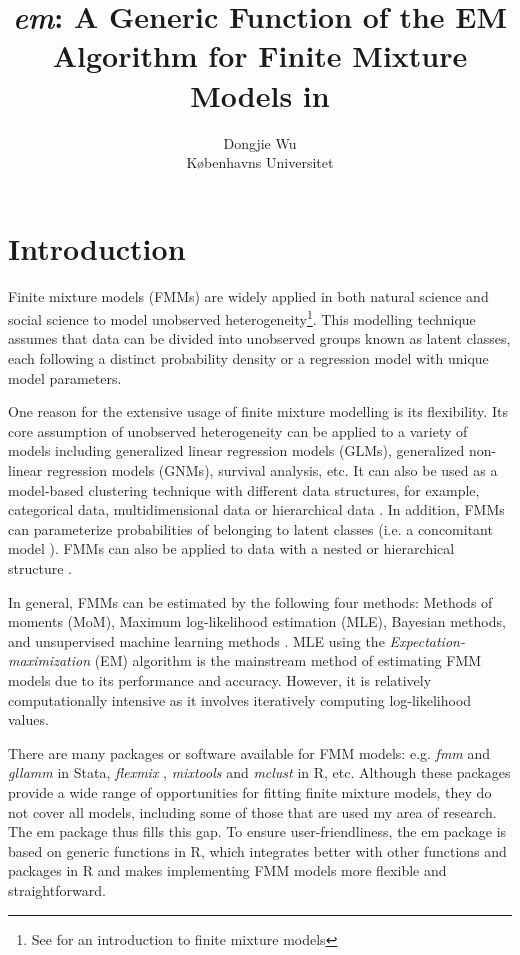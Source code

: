 \documentclass[nojss]{jss}
\title{\emph{em}: A Generic Function of the EM Algorithm for Finite Mixture Models in \proglang{R}}
\author{Dongjie Wu\\Københavns Universitet}
\begin{document}
   \section{Introduction}
Finite mixture models (FMMs) are widely applied in both natural science and social science to model unobserved heterogeneity\footnote{See \citet{mclachlan2019finite} for an introduction to finite mixture models}. This modelling technique assumes that data can be divided into unobserved groups known as latent classes, each following a distinct probability density or a regression model with unique model parameters. 

One reason for the extensive usage of finite mixture modelling is its flexibility. Its core assumption of unobserved heterogeneity can be applied to a variety of models including generalized linear regression models (GLMs), generalized non-linear regression models (GNMs), survival analysis, etc. It can also be used as a model-based clustering technique with different data structures, for example, categorical data, multidimensional data or hierarchical data \citep{vermunt2008latent}. In addition, FMMs can parameterize probabilities of belonging to latent classes (i.e. a concomitant model \citep{wedel2002concomitant}). FMMs can also be applied to data with a nested or hierarchical structure \citep{vermunt2005hierarchical}.

In general, FMMs can be estimated by the following four methods: Methods of moments (MoM), Maximum log-likelihood estimation (MLE), Bayesian methods, and unsupervised machine learning methods \citep{Figue2002}. MLE using the \emph{Expectation-maximization} (EM) algorithm is the mainstream method of estimating FMM models due to its performance and accuracy. However, it is relatively computationally intensive as it involves iteratively computing log-likelihood values. 

There are many packages or software available for FMM models: e.g.  \emph{fmm} \citep{deb2007} and \emph{gllamm} \citep{rabe2004gllamm} in Stata, \emph{flexmix} \citep{leisch2004flexmix}, \emph{mixtools} \citep{benaglia2010mixtools} and \emph{mclust} \citep{scrucca2016mclust} in R, etc.
Although these packages provide a wide range of opportunities for fitting finite mixture models, they do not cover all models, including some of those that are used my area of research. The em package thus fills this gap. To ensure user-friendliness, the em package is based on generic functions in R, which integrates better with other functions and packages in R and makes implementing FMM models more flexible and straightforward.
\end{document}
